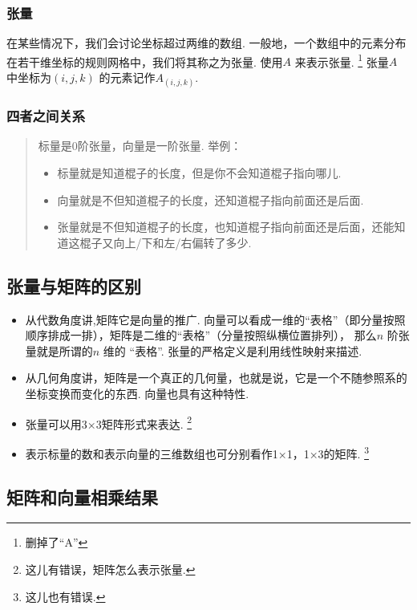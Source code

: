 \subsubsection{张量}
\begin{defination}
  在某些情况下，我们会讨论坐标超过两维的数组.
  一般地，一个数组中的元素分布在若干维坐标的规则网格中，我们将其称之为张量.
  使用\(A\) 来表示张量.
  \footnote{删掉了``A''}
  张量\(A\) 中坐标为\((i,j,k)\) 的元素记作\(A_{(i,j,k)}\).  
\end{defination}
\subsubsection{四者之间关系}
\begin{quote}
  标量是0阶张量，向量是一阶张量.
  举例：
  \begin{itemize}
  \item ​标量就是知道棍子的长度，但是你不会知道棍子指向哪儿.
  \item ​向量就是不但知道棍子的长度，还知道棍子指向前面还是后面.
  \item ​张量就是不但知道棍子的长度，也知道棍子指向前面还是后面，还能知道这棍子又向上/下和左/右偏转了多少.
  \end{itemize}
\end{quote}

\subsection{张量与矩阵的区别}
\label{ux5f20ux91cfux4e0eux77e9ux9635ux7684ux533aux522b}

\begin{itemize}
\item
  从代数角度讲,矩阵它是向量的推广.
  向量可以看成一维的``表格''（即分量按照顺序排成一排），矩阵是二维的``表格''（分量按照纵横位置排列），  那么\(n\) 阶张量就是所谓的\(n\) 维的 ``表格''.
  张量的严格定义是利用线性映射来描述.
\item  从几何角度讲，矩阵是一个真正的几何量，也就是说，它是一个不随参照系的坐标变换而变化的东西.
  向量也具有这种特性.
\item
  张量可以用3×3矩阵形式来表达.
  \footnote{这儿有错误，矩阵怎么表示张量.}
\item
  表示标量的数和表示向量的三维数组也可分别看作1×1，1×3的矩阵.
  \footnote{这儿也有错误.}
\end{itemize}

\subsection{矩阵和向量相乘结果}
\label{ux77e9ux9635ux548cux5411ux91cfux76f8ux4e58ux7ed3ux679c}

